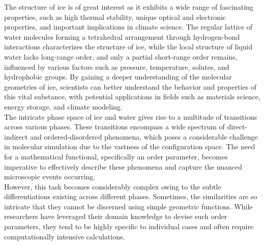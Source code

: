 The structure of ice is of great interest as it exhibits a wide range of fascinating properties, such as high thermal stability, unique optical and electronic properties, and important implications in climate science. The regular lattice of water molecules forming a tetrahedral arrangement through hydrogen-bond interactions characterizes the structure of ice, while the local structure of liquid water lacks long-range order, and only a partial short-range order remains, influenced by various factors such as pressure, temperature, solutes, and hydrophobic groups\cite{Galamba_2013}. By gaining a deeper understanding of the molecular geometries of ice, scientists can better understand the behavior and properties of this vital substance, with potential applications in fields such as materials science, energy storage, and climate modeling.\\
The intricate phase space of ice and water gives rise to a multitude of transitions across various phases\cite{Hansen2021}\cite{Chaplin2019}\cite{Bore2022}\cite{Hirata2017}. These transitions encompass a wide spectrum of direct-indirect and ordered-disordered phenomena, which poses a considerable challenge in molecular simulation due to the vastness of the configuration space. The need for a mathematical functional, specifically an order parameter, becomes imperative to effectively describe these phenomena and capture the nuanced microscopic events occurring.\\
However, this task becomes considerably complex owing to the subtle differentiations existing across different phases. Sometimes, the similarities are so intricate that they cannot be discerned using simple geometric functions\cite{Moore2011}. While researchers have leveraged their domain knowledge to devise such order parameters, they tend to be highly specific to individual cases and often require computationally intensive calculations.

